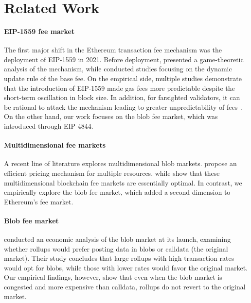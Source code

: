 \section{Related Work}
\label{subsec:litrev}


\paragraph{EIP-1559 fee market} The first major shift in the Ethereum transaction fee mechanism was the deployment of EIP-1559 in 2021. Before deployment, \textcite{roughgarden2020transaction} presented a game-theoretic analysis of the mechanism, while \textcite{leonardos2021dynamical,ferreira2021dynamic} conducted studies focusing on the dynamic update rule of the base fee. On the empirical side, multiple studies \parencite{reijsbergen2021transaction,liu2022empirical,leonardos2023optimality} demonstrate that the introduction of EIP-1559 made gas fees more predictable despite the short-term oscillation in block size. In addition, for farsighted validators, it can be rational to attack the mechanism leading to greater unpredictability of fees~\parencite{hougaard2023farsighted,azouvi2023base}. On the other hand, our work focuses on the blob fee market, which was introduced through EIP-4844. 




\paragraph{Multidimensional fee markets} A recent line of literature explores multidimensional blob markets. \textcite{diamandis2023designing} propose an efficient pricing mechanism for multiple resources, while \textcite{angeris2024multidimensional} show that these multidimensional blockchain fee markets are essentially optimal. In contrast, we empirically explore the blob fee market, which added a second dimension to Ethereum's fee market.

\paragraph{Blob fee market} \textcite{crapis2023eip} conducted an economic analysis of the blob market at its launch, examining whether rollups would prefer posting data in blobs or calldata (the original market). Their study concludes that large rollups with high transaction rates would opt for blobs, while those with lower rates would favor the original market. Our empirical findings, however, show that even when the blob market is congested and more expensive than calldata, rollups do not revert to the original market.

